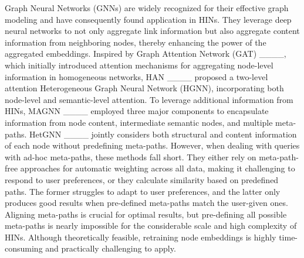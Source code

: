 Graph Neural Networks (GNNs) are widely recognized for their effective graph modeling and have consequently found application in HINs. They leverage deep neural networks to not only aggregate link information but also aggregate content information from neighboring nodes, thereby enhancing the power of the aggregated embeddings. Inspired by Graph Attention Network (GAT) ____, which initially introduced attention mechanisms for aggregating node-level information in homogeneous networks, HAN ____ proposed a two-level attention Heterogeneous Graph Neural Network (HGNN), incorporating both node-level and semantic-level attention. To leverage additional information from HINs, MAGNN ____ employed three major components to encapsulate information from node content, intermediate semantic nodes, and multiple meta-paths. HetGNN ____ jointly considers both structural and content information of each node without predefining meta-paths. However, when dealing with queries with ad-hoc meta-paths, these methods fall short. They either rely on meta-path-free approaches for automatic weighting across all data, making it challenging to respond to user preferences, or they calculate similarity based on predefined paths. The former struggles to adapt to user preferences, and the latter only produces good results when pre-defined meta-paths match the user-given ones. Aligning meta-paths is crucial for optimal results, but pre-defining all possible meta-paths is nearly impossible for the considerable scale and high complexity of HINs. Although theoretically feasible, retraining node embeddings is highly time-consuming and practically challenging to apply.



